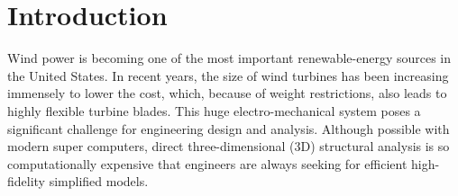 \section{Introduction} 

Wind power is becoming one of the most important renewable-energy sources in
the United States.
In recent years, the size of wind
turbines has been increasing immensely to lower the cost, which, because of
weight restrictions, also leads
to highly flexible turbine blades. This huge electro-mechanical system poses
a significant challenge for engineering design and analysis. Although
possible with modern super computers, direct three-dimensional (3D)
structural analysis is so computationally expensive that engineers are
always seeking for efficient high-fidelity simplified models.

